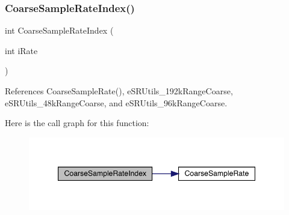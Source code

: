 \subsubsection{\texorpdfstring{CoarseSampleRateIndex()}{CoarseSampleRateIndex()}}
{\footnotesize\ttfamily int Coarse\+Sample\+Rate\+Index (\begin{DoxyParamCaption}\item[{int}]{i\+Rate }\end{DoxyParamCaption})\hspace{0.3cm}{\ttfamily [inline]}}



References Coarse\+Sample\+Rate(), e\+S\+R\+Utils\+\_\+192k\+Range\+Coarse, e\+S\+R\+Utils\+\_\+48k\+Range\+Coarse, and e\+S\+R\+Utils\+\_\+96k\+Range\+Coarse.

Here is the call graph for this function\+:
\nopagebreak
\begin{figure}[H]
\begin{center}
\leavevmode
\includegraphics[width=347pt]{a00782_a149fe437454807a2d3edacf8de72c2a1_cgraph}
\end{center}
\end{figure}
